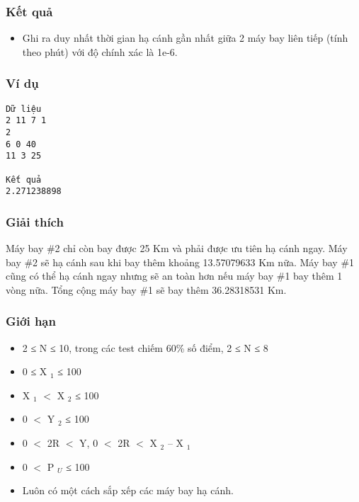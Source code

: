 \subsubsection{   Kết quả  }
\begin{itemize}
	\item     Ghi ra duy nhất thời gian hạ cánh gần nhất giữa 2 máy bay liên tiếp (tính theo phút) với độ chính xác là 1e-6.   
\end{itemize}

\subsubsection{   Ví dụ  }
\begin{verbatim}
Dữ liệu
2 11 7 1
2
6 0 40
11 3 25	

Kết quả
2.271238898
\end{verbatim}

\subsubsection{   Giải thích  }

   Máy bay \#2 chỉ còn bay được 25 Km và phải được ưu tiên hạ cánh ngay. Máy bay \#2 sẽ hạ cánh sau khi bay thêm khoảng 13.57079633 Km nữa. Máy bay \#1 cũng có thể hạ cánh ngay nhưng sẽ an toàn hơn nếu máy bay \#1 bay thêm 1 vòng nữa. Tổng cộng máy bay \#1 sẽ bay thêm 36.28318531 Km.  

\subsubsection{   Giới hạn  }
\begin{itemize}
	\item     2 ≤ N ≤ 10, trong các test chiếm 60\% số điểm, 2 ≤ N ≤ 8   
	\item     0 ≤ X    $_     1    $    ≤ 100   
	\item     X    $_     1    $    $<$ X    $_     2    $    ≤ 100   
	\item     0 $<$ Y    $_     2    $    ≤ 100   
	\item     0 $<$ 2R $<$ Y, 0 $<$ 2R $<$ X    $_     2    $    – X    $_     1    $
	\item     0 $<$ P    $_     U    $    ≤ 100   
	\item     Luôn có một cách sắp xếp các máy bay hạ cánh.   
\end{itemize}